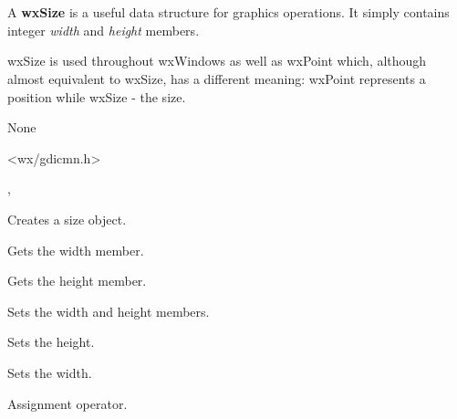 \section{}\label{wxsize}

A {\bf wxSize} is a useful data structure for graphics operations.
It simply contains integer {\it width} and {\it height} members.

wxSize is used throughout wxWindows as well as wxPoint which, although almost
equivalent to wxSize, has a different meaning: wxPoint represents a position
while wxSize - the size.



None


<wx/gdicmn.h>


, 





Creates a size object.

\label{wxsizegetwidth}


Gets the width member.

\label{wxsizegetheight}


Gets the height member.

\label{wxsizeset}


Sets the width and height members.

\label{wxsizesetheight}


Sets the height.

\label{wxsizesetwidth}


Sets the width.



Assignment operator.


